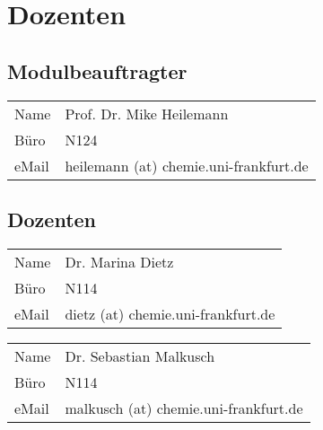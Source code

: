 \section{Dozenten}
\subsection*{Modulbeauftragter}
\begin{tabular}{ll}
Name & Prof. Dr. Mike Heilemann\\
Büro & N124\\
eMail & heilemann (at) chemie.uni-frankfurt.de
\end{tabular}

\subsection*{Dozenten}
\begin{tabular}{ll}
Name & Dr. Marina Dietz\\
Büro & N114\\
eMail & dietz (at) chemie.uni-frankfurt.de
\end{tabular}

\vspace{0.5cm} 

\noindent
\begin{tabular}{ll}
Name & Dr. Sebastian Malkusch\\
Büro & N114\\
eMail & malkusch (at) chemie.uni-frankfurt.de
\end{tabular}